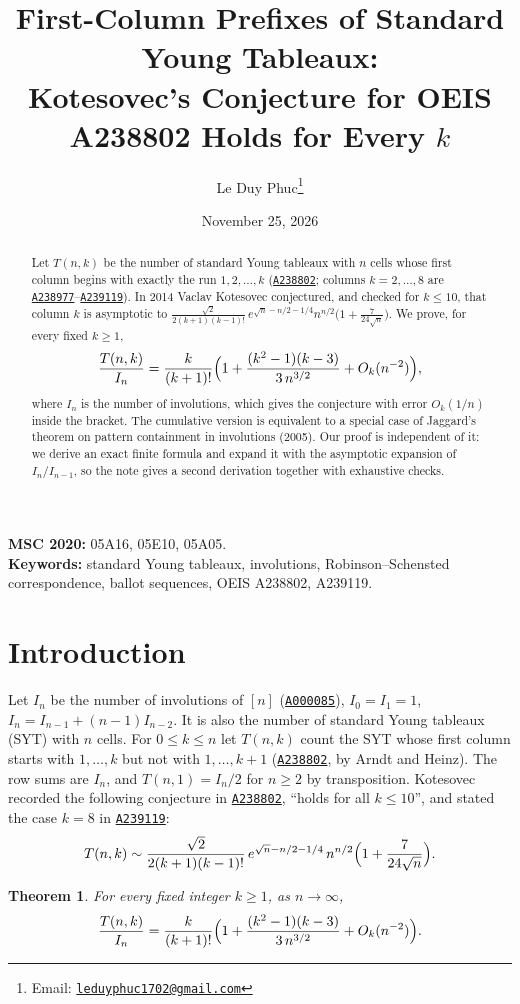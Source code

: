 \documentclass[11pt,a4paper]{article}
\title{First-Column Prefixes of Standard Young Tableaux:\\
Kotesovec's Conjecture for OEIS A238802 Holds for Every $k$}
\author{Le Duy Phuc\thanks{Email: \href{mailto:leduyphuc1702@gmail.com}{\texttt{leduyphuc1702@gmail.com}}}}
\date{November 25, 2026}
\newtheorem{theorem}{Theorem}
\theoremstyle{remark}
\newcommand{\oeis}[1]{\href{https://oeis.org/#1}{\texttt{#1}}}
\begin{document}
\maketitle

\begin{abstract}
Let $T(n,k)$ be the number of standard Young tableaux with $n$ cells whose first column begins with exactly the run $1,2,\dots,k$ (\oeis{A238802}; columns $k=2,\dots,8$ are \oeis{A238977}--\oeis{A239119}). In 2014 Vaclav Kotesovec conjectured, and checked for $k\le10$, that column $k$ is asymptotic to $\frac{\sqrt2}{2(k+1)(k-1)!}\,e^{\sqrt n-n/2-1/4}n^{n/2}\bigl(1+\frac7{24\sqrt n}\bigr)$. We prove, for every fixed $k\ge1$,
\[
 \frac{T(n,k)}{I_n}=\frac k{(k+1)!}\Bigl(1+\frac{(k^2-1)(k-3)}{3\,n^{3/2}}+O_k(n^{-2})\Bigr),
\]
where $I_n$ is the number of involutions, which gives the conjecture with error $O_k(1/n)$ inside the bracket. The cumulative version is equivalent to a special case of Jaggard's theorem on pattern containment in involutions (2005). Our proof is independent of it: we derive an exact finite formula and expand it with the asymptotic expansion of $I_n/I_{n-1}$, so the note gives a second derivation together with exhaustive checks.
\end{abstract}

\noindent\textbf{MSC 2020:} 05A16, 05E10, 05A05.\\
\textbf{Keywords:} standard Young tableaux, involutions, Robinson--Schensted correspondence, ballot sequences, OEIS A238802, A239119.

\section{Introduction}

Let $I_n$ be the number of involutions of $[n]$ (\oeis{A000085}), $I_0=I_1=1$, $I_n=I_{n-1}+(n-1)I_{n-2}$. It is also the number of standard Young tableaux (SYT) with $n$ cells. For $0\le k\le n$ let $T(n,k)$ count the SYT whose first column starts with $1,\dots,k$ but not with $1,\dots,k+1$ (\oeis{A238802}, by Arndt and Heinz). The row sums are $I_n$, and $T(n,1)=I_n/2$ for $n\ge2$ by transposition. Kotesovec recorded the following conjecture in \oeis{A238802}, ``holds for all $k\le10$'', and stated the case $k=8$ in \oeis{A239119}:
\[
 T(n,k)\sim\frac{\sqrt2}{2(k+1)(k-1)!}\,e^{\sqrt n-n/2-1/4}\,n^{n/2}\Bigl(1+\frac7{24\sqrt n}\Bigr).
\]

\begin{theorem}\label{thm:main}
For every fixed integer $k\ge1$, as $n\to\infty$,
\[
 \frac{T(n,k)}{I_n}=\frac k{(k+1)!}\Bigl(1+\frac{(k^2-1)(k-3)}{3\,n^{3/2}}+O_k(n^{-2})\Bigr).
\]
\end{theorem}
\end{document}
